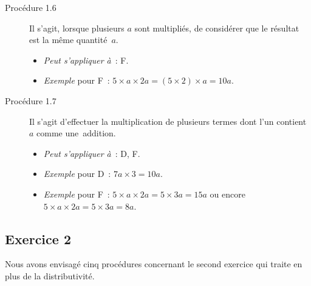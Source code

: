 \documentclass{report}
\theoremstyle{definition}
\begin{document}
\begin{description}
\item[\textcolor{mpc}{Procédure 1.6}] Il s'agit, lorsque plusieurs $a$ sont multipliés, de considérer que le résultat est la même quantité~$a$.
\begin{itemize}
\item \textit{Peut s'appliquer à}~:  F.
\item \textit{Exemple} pour F~: $5\times a \times 2a = (5\times 2)\times a = 10a$.
\end{itemize}

\item[\textcolor{mpc}{Procédure 1.7}] Il s'agit d'effectuer la multiplication de plusieurs termes dont l'un contient $a$ comme une~addition.
\begin{itemize}
\item \textit{Peut s'appliquer à}~:  D, F.
\item \textit{Exemple} pour D~: $7a\times 3 = 10a$.
\item \textit{Exemple} pour F~: $5\times a \times 2a = 5\times 3a = 15a$ ou encore $5\times a \times 2a=5\times 3a=8a$.
\end{itemize}
\end{description}

\subsection*{Exercice 2}
Nous avons envisagé cinq procédures concernant le second exercice qui traite en plus de la distributivité.
\end{document}
